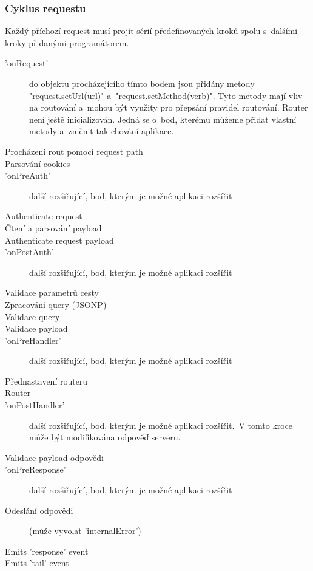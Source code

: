 \documentclass[a4paper,12pt,twoside,BCOR=10mm]{article}
\begin{document}
\subsubsection{Cyklus requestu}
Každý příchozí request musí projít sérií předefinovaných kroků spolu s~dalšími kroky přidanými programátorem.\cite{hapiJSDOC}
\begin{description}
\item['onRequest'] do objektu procházejícího tímto bodem jsou přidány metody "request.setUrl(url)" a~"request.setMethod(verb)". Tyto metody mají vliv na routování a~mohou být využity pro přepsání pravidel routování. Router není ještě inicializován. Jedná se o~bod, kterému můžeme přidat vlastní metody a~změnit tak chování aplikace.
\item[Procházení rout pomocí request path]
\item[Parsování cookies]
\item['onPreAuth'] další rozšiřující, bod, kterým je možné aplikaci rozšířit
\item[Authenticate request]
\item[Čtení a parsování payload]
\item[Authenticate request payload]
\item['onPostAuth'] další rozšiřující, bod, kterým je možné aplikaci rozšířit
\item[Validace parametrů cesty]
\item[Zpracování query (JSONP)]
\item[Validace query]
\item[Validace payload]
\item['onPreHandler'] další rozšiřující, bod, kterým je možné aplikaci rozšířit
\item[Přednastavení routeru]
\item[Router]
\item['onPostHandler'] další rozšiřující, bod, kterým je možné aplikaci rozšířit. V tomto kroce může být modifikována odpověď serveru.
\item[Validace payload odpovědi]
\item['onPreResponse'] další rozšiřující, bod, kterým je možné aplikaci rozšířit
\item[Odeslání odpovědi] (může vyvolat 'internalError')
\item[Emits 'response' event]
\item[Emits 'tail' event]
\end{description}
\end{document}
